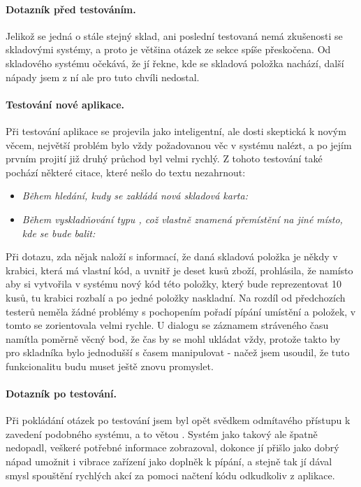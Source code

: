 \paragraph{Dotazník před testováním.} Jelikož se jedná o stále stejný sklad, ani poslední testovaná nemá zkušenosti se skladovými systémy, a proto je většina otázek ze sekce  spíše přeskočena. Od skladového systému očekává, že jí řekne, kde se skladová položka nachází, další nápady jsem z ní ale pro tuto chvíli nedostal.

\paragraph{Testování nové aplikace.} Při testování aplikace se projevila jako inteligentní, ale dosti skeptická k novým věcem, největší problém bylo vždy požadovanou věc v systému nalézt, a po jejím prvním projití již druhý průchod byl velmi rychlý. Z tohoto testování také pochází některé citace, které nešlo do textu nezahrnout:
\begin{itemize}
	\item \emph{Během hledání, kudy se zakládá nová skladová karta:} 
	\item \emph{Během vyskladňování typu , což vlastně znamená přemístění na jiné místo, kde se bude balit:} 
\end{itemize}
Při dotazu, zda nějak naloží s informací, že daná skladová položka je někdy v krabici, která má vlastní kód, a uvnitř je deset kusů zboží, prohlásila, že namísto aby si vytvořila v systému nový kód této položky, který bude reprezentovat 10 kusů, tu krabici rozbalí a po jedné položky naskladní. Na rozdíl od předchozích testerů neměla žádné problémy s pochopením pořadí pípání umístění a položek, v tomto se zorientovala velmi rychle. U dialogu se záznamem stráveného času namítla poměrně věcný bod, že čas by se mohl ukládat vždy, protože takto by pro skladníka bylo jednodušší s časem manipulovat - načež jsem usoudil, že tuto funkcionalitu budu muset ještě znovu promyslet.

\paragraph{Dotazník po testování.} Při pokládání otázek po testování jsem byl opět svědkem odmítavého přístupu k zavedení podobného systému, a to větou . Systém jako takový ale špatně nedopadl, veškeré potřebné informace zobrazoval, dokonce jí přišlo jako dobrý nápad umožnit i vibrace zařízení jako doplněk k pípání, a stejně tak jí dával smysl spouštění rychlých akcí za pomoci načtení kódu odkudkoliv z aplikace.


